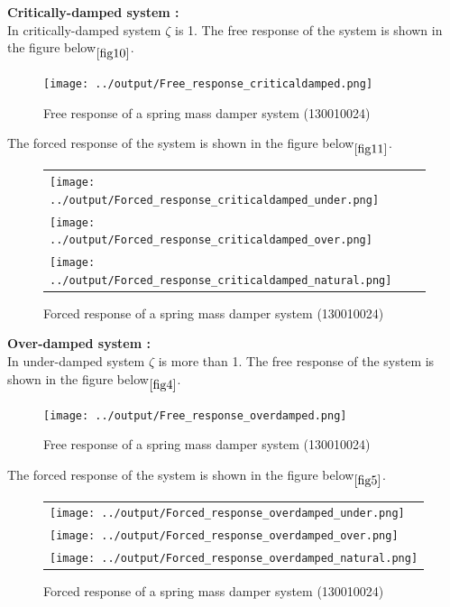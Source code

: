 \documentclass[11pt]{article}
\begin{document}
\newpage
\noindent\textbf{Critically-damped system :} \\
In critically-damped system $\zeta$ is 1.
The free response of the system is shown in the figure below$\phantom{}_{\ref{fig10}}$.

\begin{figure}[H]
	\centering
	\centering
	\texttt{[image: ../output/Free\_response\_criticaldamped.png]}
	\caption{Free response of a spring mass damper system (130010024)}
\end{figure}
\label{fig10}

\newpage
The forced response of the system is shown in the figure below$\phantom{}_{\ref{fig11}}$.

\begin{figure}[H]
	\centering
	\begin{tabular} {l}
	\texttt{[image: ../output/Forced\_response\_criticaldamped\_under.png]} \\
	\texttt{[image: ../output/Forced\_response\_criticaldamped\_over.png]} \\
	\texttt{[image: ../output/Forced\_response\_criticaldamped\_natural.png]} 
	\end{tabular}
	\caption{Forced response of a spring mass damper system (130010024)}
\end{figure}
\label{fig11}


 
\newpage
\noindent\textbf{Over-damped system :} \\
In under-damped system $\zeta$ is more than 1.
The free response of the system is shown in the figure below$\phantom{}_{\ref{fig4}}$.

\begin{figure}[H]
	\centering
	\centering
	\texttt{[image: ../output/Free\_response\_overdamped.png]}
	\caption{Free response of a spring mass damper system (130010024)}
\end{figure}
\label{fig4}

\newpage
The forced response of the system is shown in the figure below$\phantom{}_{\ref{fig5}}$.

\begin{figure}[H]
	\centering
	\begin{tabular} {l}
	\texttt{[image: ../output/Forced\_response\_overdamped\_under.png]} \\
	\texttt{[image: ../output/Forced\_response\_overdamped\_over.png]} \\
	\texttt{[image: ../output/Forced\_response\_overdamped\_natural.png]} 
	\end{tabular}
	\caption{Forced response of a spring mass damper system (130010024)}
\end{figure}
\label{fig5}
\end{document}
